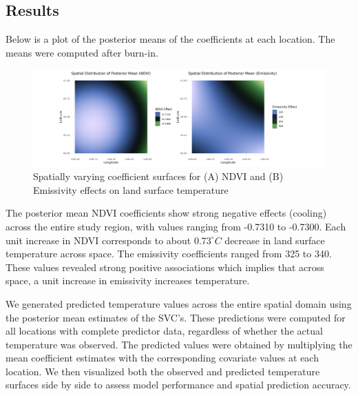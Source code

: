 \subsection{Results}
% 
% 
Below is a plot of the posterior means of the coefficients at each location. The means were computed after burn-in.
\begin{figure}[H]
 \centering
 \includegraphics[width=\textwidth]{../../figures/model_means.png}
 \caption{Spatially varying coefficient surfaces for (A) NDVI and (B) Emissivity effects on land surface temperature}
 \label{fig:posterior means}
 \end{figure}
 The posterior mean NDVI coefficients show strong negative effects (cooling) across the entire study region, with values ranging from -0.7310 to -0.7300. 
 Each unit increase in NDVI corresponds to about $0.73^\circ C$ decrease in land surface temperature across space.
 The emissivity coefficients ranged from 325 to 340. These values revealed strong positive associations  which implies that across space, a unit increase in emissivity increases temperature.
 
 We generated predicted temperature values across the entire spatial domain using the posterior mean estimates of the SVC's. 
 These predictions were computed for all locations with complete predictor data, regardless of whether the actual temperature was observed. 
 The predicted values were obtained by multiplying the mean coefficient estimates with the corresponding covariate values at each location. 
 We then visualized both the observed and predicted temperature surfaces side by side to assess model performance and spatial prediction accuracy.
 
